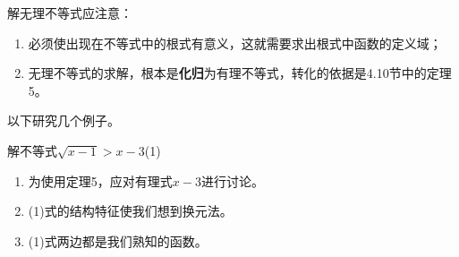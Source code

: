 解无理不等式应注意：
\begin{enumerate}[(1)]
\item 必须使出现在不等式中的根式有意义，这就需要求出根式中函数的定义域；
\item 无理不等式的求解，根本是\textbf{化归}为有理不等式，转化的依据是4.10节中的定理5。
\end{enumerate}

以下研究几个例子。

\begin{example}
解不等式$\sqrt{x-1}>x-3$\hfill (1)
\end{example}

\begin{analyze}
\begin{enumerate}
    \item 为使用定理5，应对有理式$x-3$进行讨论。
    \item (1)式的结构特征使我们想到换元法。
    \item (1)式两边都是我们熟知的函数。
\end{enumerate}
\end{analyze}


